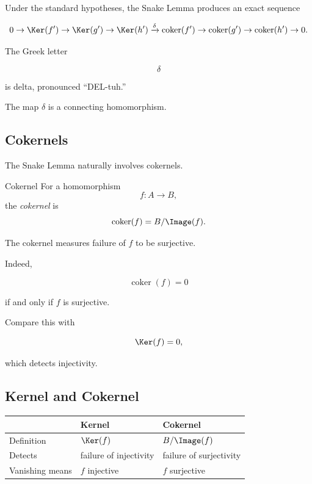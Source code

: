 Under the standard hypotheses, the Snake Lemma produces an exact sequence

\[ 0\to\Ker(f')\to\Ker(g')\to\Ker(h')
\xrightarrow{\delta}
\operatorname{coker}(f')
\to\operatorname{coker}(g')
\to\operatorname{coker}(h')\to0. \]

The Greek letter

\[ \delta \]

is delta, pronounced ``DEL-tuh.''

The map \(\delta\) is a connecting homomorphism.

\subsection{Cokernels}
\label{subsec:cokernels-homological}

The Snake Lemma naturally involves cokernels.

\begin{definitionbox}{Cokernel}
For a homomorphism
\[ f:A\to B, \]
the \emph{cokernel} is
\[ \operatorname{coker}(f)=B/\Image(f). \]
\end{definitionbox}

The cokernel measures failure of \(f\) to be surjective.

Indeed,

\[ \operatorname{coker}(f)=0 \]

if and only if \(f\) is surjective.

Compare this with

\[ \Ker(f)=0, \]

which detects injectivity.

\subsection{Kernel and Cokernel}
\label{subsec:kernel-cokernel-comparison}

\begin{center}
\begin{tabularx}{0.9\textwidth}{@{}lXX@{}}
\toprule
 & \textbf{Kernel} & \textbf{Cokernel}\\
\midrule
Definition & \(\Ker(f)\) & \(B/\Image(f)\)\\
Detects & failure of injectivity & failure of surjectivity\\
Vanishing means & \(f\) injective & \(f\) surjective\\
\bottomrule
\end{tabularx}
\end{center}

